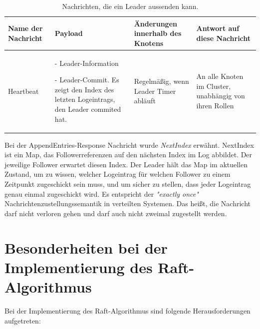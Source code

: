 \begin{table} \centering
	\begin{tabular}{|p{2.5cm}|p{3.5cm}|p{4cm}|p{4.5cm}|} 
		\hline
		\textbf{Name der Nachricht} & \textbf{Payload} & \textbf{Änderungen innerhalb des Knotens} & \textbf{Antwort auf diese Nachricht}\\
		
		\hline
		Heartbeat 
		&
		- Leader-Information
		
		- Leader-Commit. Es zeigt den Index des letzten Logeintrags, den Leader commited hat.
		& 
		Regelmäßig, wenn Leader Timer abläuft
		& An alle Knoten im Cluster, unabhängig von ihren Rollen\\
		
		\hline
	\end{tabular}
	\caption{Nachrichten, die ein Leader aussenden kann.}
	\label{tab:leaderSend}
\end{table}

Bei der AppendEntries-Response Nachricht wurde \textit{NextIndex} erwähnt. NextIndex ist ein Map, das Followerreferenzen auf den nächsten Index im Log abbildet. Der jeweilige Follower erwartet diesen Index. Der Leader hält das Map im aktuellen Zustand, um zu wissen, welcher Logeintrag für welchen Follower zu einem Zeitpunkt zugeschickt sein muss, und um sicher zu stellen, dass jeder Logeintrag genau einmal zugeschickt wird. Es entspricht der \textit{"exactly once"} Nachrichtenzustellungssemantik in verteilten Systemen. Das heißt, die Nachricht darf nicht verloren gehen und darf auch nicht zweimal zugestellt werden.

\section{Besonderheiten bei der Implementierung des Raft-Algorithmus}

Bei der Implementierung des Raft-Algorithmus sind folgende Herausforderungen aufgetreten:

